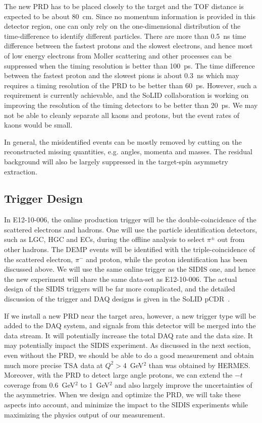 The new PRD has to be placed closely to the target and the TOF distance is
expected to be about 80~cm. Since no momentum information is provided in this
detector region, one can only rely on the one-dimensional distribution of the
time-difference to identify different particles. There are more than 0.5~ns
time difference between the fastest protons and the slowest electrons, and
hence most of low energy electrons from Moller scattering and other processes
can be suppressed when the timing resolution is better than 100~ps. The time
difference between the fastest proton and the slowest pions is about 0.3~ns
which may requires a timing resolution of the PRD to be better than 60~ps.
However, such a requirement is currently achievable, and the SoLID
collaboration is working on improving the resolution of the timing detectors to
be better than 20~ps. We may not be able to cleanly separate all kaons and
protons, but the event rates of kaons would be small.

In general, the misidentified events can be mostly removed by cutting on the
reconstructed missing quantities, e.g. angles, momenta and masses. The residual
background will also be largely suppressed in the target-spin asymmetry
extraction.

\subsection{Trigger Design}

In E12-10-006, the online production trigger will be the double-coincidence of
the scattered electrons and hadrons. One will use the particle identification
detectors, such as LGC, HGC and ECs, during the offline analysis to select
$\pi^{\pm}$ out from other hadrons. The DEMP events will be identified with the
triple-coincidence of the scattered electron, $\pi^{-}$ and proton, while the
proton identification has been discussed above. We will use the same online
trigger as the SIDIS one, and hence the new experiment will share the same
data-set as E12-10-006. The actual design of the SIDIS triggers will be far
more complicated, and the detailed discussion of the trigger and DAQ designs is
given in the SoLID pCDR~\cite{solid_pcdr}.

If we install a new PRD near the target area, however, a new trigger type will
be added to the DAQ system, and signals from this detector will be merged into
the data stream. It will potentially increase the total DAQ rate and the data
size. It may potentially impact the SIDIS experiment.  As discussed in
the next section, even without the PRD, we should be able to do a good
measurement and obtain much more precise TSA data at $Q^{2}>$4~GeV$^{2}$ than
was obtained by HERMES.  Moreover, with the PRD to detect large angle protons,
we can extend the $-t$ coverage from 0.6~GeV$^{2}$ to 1~GeV$^{2}$ and also
largely improve the uncertainties of the asymmetries. When we design and
optimize the PRD, we will take these aspects into account, and minimize the
impact to the SIDIS experiments while maximizing the physics output of our
measurement.
